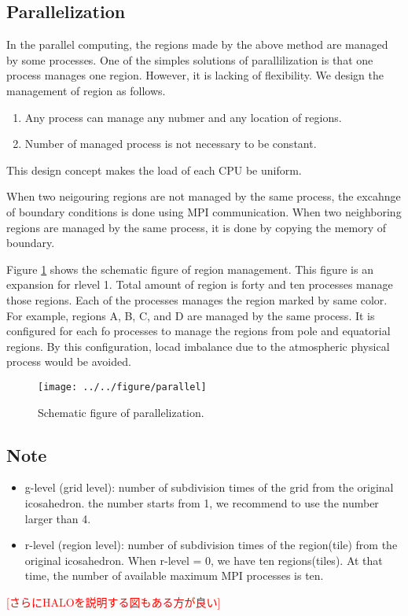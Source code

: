 \subsection{Parallelization}
In the parallel computing, the regions made by the above method are managed by
some processes. One of the simples solutions of parallilization is that one
process manages one region. However, it is lacking of flexibility. We design
the management of region as follows.
\begin{enumerate}
  \item Any process can manage any nubmer and any location of regions.
  \item Number of managed process is not necessary to be constant.
\end{enumerate}
This design concept makes the load of each CPU be uniform.

When two neigouring regions are not managed by the same process, the excahnge
of boundary conditions is done using MPI communication. When two neighboring
regions are managed by the same process, it is done by copying the memory of
boundary.

Figure \ref{fig:scale-gm_parallel} shows the schematic figure of region management. This figure is an
expansion for rlevel 1. Total amount of region is forty and ten processes
manage those regions. Each of the processes manages the region marked by same
color. For example, regions A, B, C, and D are managed by the same process. It
is configured for each fo processes to manage the regions from pole and
equatorial regions. By this configuration, locad imbalance due to the
atmospheric physical process would be avoided.

\begin{figure}[H]
  \begin{center}
    \texttt{[image: ../../figure/parallel]}
    \caption{Schematic figure of parallelization.}
    \label{fig:scale-gm_parallel}
  \end{center}
\end{figure}



\subsection{Note}
 \begin{itemize}
   \item g-level (grid level): number of subdivision times of the grid from the original icosahedron.
         the number starts from 1, we recommend to use the number larger than 4.
   \item r-level (region level): number of subdivision times of the region(tile)
         from the original icosahedron. When r-level = 0, we have ten regions(tiles).
         At that time, the number of available maximum MPI processes is ten.
 \end{itemize}

\textcolor{red}{[さらにHALOを説明する図もある方が良い]}

